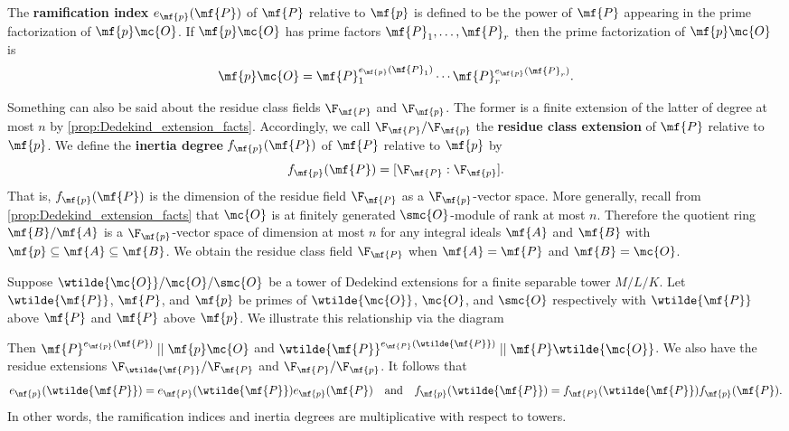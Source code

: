     The \textbf{ramification index} \(e_{\mf{p}}(\mf{P})\) of \(\mf{P}\) relative to \(\mf{p}\) is defined to be the power of \(\mf{P}\) appearing in the prime factorization of \(\mf{p}\mc{O}\). If \(\mf{p}\mc{O}\) has prime factors \(\mf{P}_{1},\ldots,\mf{P}_{r}\) then the prime factorization of \(\mf{p}\mc{O}\) is
    \[
      \mf{p}\mc{O} = \mf{P}_{1}^{e_{\mf{p}}(\mf{P}_{1})} \cdots \mf{P}_{r}^{e_{\mf{p}}(\mf{P}_{r})}.
    \]

    Something can also be said about the residue class fields \(\F_{\mf{P}}\) and \(\F_{\mf{p}}\). The former is a finite extension of the latter of degree at most \(n\) by \cref{prop:Dedekind_extension_facts}. Accordingly, we call \(\F_{\mf{P}}/\F_{\mf{p}}\) the \textbf{residue class extension} of \(\mf{P}\) relative to \(\mf{p}\). We define the \textbf{inertia degree} \(f_{\mf{p}}(\mf{P})\) of \(\mf{P}\) relative to \(\mf{p}\) by
    \[
      f_{\mf{p}}(\mf{P}) = [\F_{\mf{P}}:\F_{\mf{p}}].
    \]
    That is, \(f_{\mf{p}}(\mf{P})\) is the dimension of the residue field \(\F_{\mf{P}}\) as a \(\F_{\mf{p}}\)-vector space. More generally, recall from \cref{prop:Dedekind_extension_facts} that \(\mc{O}\) is at finitely generated \(\smc{O}\)-module of rank at most \(n\). Therefore the quotient ring \(\mf{B}/\mf{A}\) is a \(\F_{\mf{p}}\)-vector space of dimension at most \(n\) for any integral ideals \(\mf{A}\) and \(\mf{B}\) with \(\mf{p} \subseteq \mf{A} \subseteq \mf{B}\). We obtain the residue class field \(\F_{\mf{P}}\) when \(\mf{A} = \mf{P}\) and \(\mf{B} = \mc{O}\).

    Suppose \(\wtilde{\mc{O}}/\mc{O}/\smc{O}\) be a tower of Dedekind extensions for a finite separable tower \(M/L/K\). Let \(\wtilde{\mf{P}}\), \(\mf{P}\), and \(\mf{p}\) be primes of \(\wtilde{\mc{O}}\), \(\mc{O}\), and \(\smc{O}\) respectively with \(\wtilde{\mf{P}}\) above \(\mf{P}\) and \(\mf{P}\) above \(\mf{p}\). We illustrate this relationship via the diagram
    \begin{center}
    \end{center} 
    Then \(\mf{P}^{e_{\mf{p}}(\mf{P})} \mid\mid \mf{p}\mc{O}\) and \(\wtilde{\mf{P}}^{e_{\mf{P}}(\wtilde{\mf{P}})} \mid\mid \mf{P}\wtilde{\mc{O}}\). We also have the residue extensions \(\F_{\wtilde{\mf{P}}}/\F_{\mf{P}}\) and \(\F_{\mf{P}}/\F_{\mf{p}}\). It follows that
    \begin{equation}\label{equ:ramification_and_interia_towers}
      e_{\mf{p}}(\wtilde{\mf{P}}) = e_{\mf{P}}(\wtilde{\mf{P}})e_{\mf{p}}(\mf{P}) \quad \text{and} \quad f_{\mf{p}}(\wtilde{\mf{P}}) = f_{\mf{P}}(\wtilde{\mf{P}})f_{\mf{p}}(\mf{P}).
    \end{equation}
    In other words, the ramification indices and inertia degrees are multiplicative with respect to towers.

